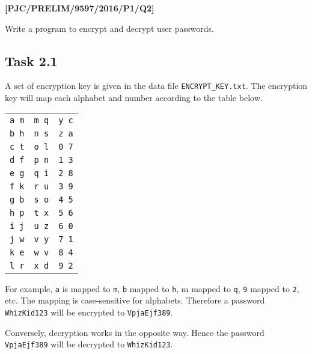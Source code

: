 \item \textbf{{[}PJC/PRELIM/9597/2016/P1/Q2{]} }

Write a program to encrypt and decrypt user passwords. 

\subsection*{Task 2.1}

A set of encryption key is given in the data file \texttt{ENCRYPT\_KEY.txt}.
The encryption key will map each alphabet and number according to
the table below.
\noindent \begin{center}
\texttt{}%
\begin{tabular}{ccc}
\texttt{a \textrightarrow{} m} & \texttt{m \textrightarrow{} q} & \texttt{y \textrightarrow{} c}\tabularnewline
\texttt{b \textrightarrow{} h} & \texttt{n \textrightarrow{} s} & \texttt{z \textrightarrow{} a}\tabularnewline
\texttt{c \textrightarrow{} t} & \texttt{o \textrightarrow{} l} & \texttt{0 \textrightarrow{} 7}\tabularnewline
\texttt{d \textrightarrow{} f} & \texttt{p \textrightarrow{} n} & \texttt{1 \textrightarrow{} 3}\tabularnewline
\texttt{e \textrightarrow{} g} & \texttt{q \textrightarrow{} i} & \texttt{2 \textrightarrow{} 8}\tabularnewline
\texttt{f \textrightarrow{} k} & \texttt{r \textrightarrow{} u} & \texttt{3 \textrightarrow{} 9}\tabularnewline
\texttt{g \textrightarrow{} b} & \texttt{s \textrightarrow{} o} & \texttt{4 \textrightarrow{} 5}\tabularnewline
\texttt{h \textrightarrow{} p} & \texttt{t \textrightarrow{} x} & \texttt{5 \textrightarrow{} 6}\tabularnewline
\texttt{i \textrightarrow{} j} & \texttt{u \textrightarrow{} z} & \texttt{6 \textrightarrow{} 0}\tabularnewline
\texttt{j \textrightarrow{} w} & \texttt{v \textrightarrow{} y} & \texttt{7 \textrightarrow{} 1}\tabularnewline
\texttt{k \textrightarrow{} e} & \texttt{w \textrightarrow{} v} & \texttt{8 \textrightarrow{} 4}\tabularnewline
\texttt{l \textrightarrow{} r} & \texttt{x \textrightarrow{} d} & \texttt{9 \textrightarrow{} 2}\tabularnewline
\end{tabular}
\par\end{center}

For example, \texttt{a} is mapped to \texttt{m}, \texttt{b} mapped
to \texttt{h}, m mapped to \texttt{q}, \texttt{9} mapped to \texttt{2},
etc. The mapping is case-sensitive for alphabets. Therefore a password
\texttt{WhizKid123} will be encrypted to \texttt{VpjaEjf389}.

Conversely, decryption works in the opposite way. Hence the password
\texttt{VpjaEjf389} will be decrypted to \texttt{WhizKid123}. 

